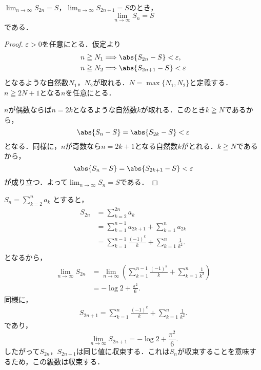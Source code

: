 \begin{lemma}{}{}
    $\lim_{n \to \infty} S_{2n}=S$，$\lim_{n \to \infty} S_{2n+1}=S$のとき，
    \[
        \lim_{n \to \infty} S_n = S
    \]
    である．
\end{lemma}
\begin{proof}
    $\varepsilon >0$を任意にとる．仮定より
    \begin{align*}
         & n \geqq N_1 \Longrightarrow \abs{S_{2n}-S} < \varepsilon,  \\
         & n \geqq N_2 \Longrightarrow \abs{S_{2n+1}-S} < \varepsilon
    \end{align*}
    となるような自然数$N_1$，$N_2$が取れる．$N=\max\{N_1, N_2\}$と定義する．$n \geqq 2N +1$となる$n$を任意にとる．

    $n$が偶数ならば$n =2k$となるような自然数$k$が取れる．このとき$k \geqq N$であるから，
    \[
        \abs{S_n -S}=\abs{S_{2k}-S}<\varepsilon
    \]
    となる．同様に，$n$が奇数なら$n =2k+1$となる自然数$k$がとれる．$k \geqq N$であるから，
    \[
        \abs{S_n -S}=\abs{S_{2k+1}-S}<\varepsilon
    \]
    が成り立つ．よって$\lim_{n \to \infty} S_n =S$である．
\end{proof}

\begin{tanswer}
    $S_{n} = \sum ^{n}_{k=2} a_k$ とすると，
    \begin{align*}
        S_{2n} & = \sum ^{2n}_{k=2} a_{k}                                              \\
               & = \sum ^{n-1}_{k=1} a_{2k+1} + \sum ^{n}_{k=1} a_{2k}                 \\
               & = \sum ^{n-1}_{k=1} \frac{(-1)^k}{k} + \sum ^{n}_{k=1} \frac{1}{k^2}. \\
    \end{align*}
    となるから，
    \begin{align*}
        \lim_{n \to \infty} S_{2n} & =\lim_{n \to \infty} \left (\sum ^{n-1}_{k=1} \frac{(-1)^k}{k} + \sum ^{n}_{k=1} \frac{1}{k^2} \right ) \\
                                   & = -\log 2 + \frac{\pi^2}{6}.
    \end{align*}
    同様に，
    \begin{align*}
        S_{2n+1} = \sum ^{n}_{k=1} \frac{(-1)^k}{k} + \sum ^{n}_{k=1} \frac{1}{k^2}.
    \end{align*}
    であり，
    \[
        \lim_{n \to \infty} S_{2n+1} = -\log 2 + \frac{\pi^2}{6}.
    \]
    したがって$S_{2n}$，$S_{2n+1}$は同じ値に収束する．これは$S_{n}$が収束することを意味するため，この級数は収束する．
\end{tanswer}


